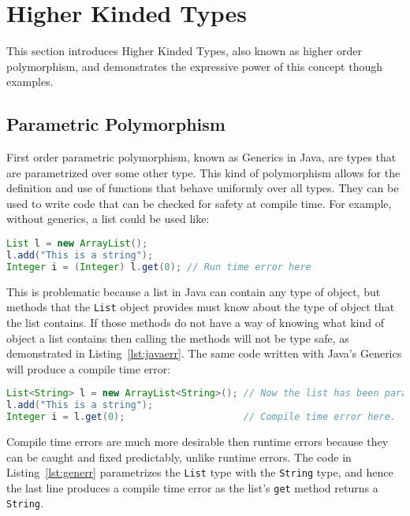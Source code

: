 \section{Higher Kinded Types}
This section introduces Higher Kinded Types, also known as higher order
polymorphism, and demonstrates the expressive power of this concept though
examples.

\subsection{Parametric Polymorphism}\label{sec:generics}
First order parametric polymorphism, known as Generics in Java, are types that
are parametrized over some other type. This kind of polymorphism allows for the
definition and use of functions that behave uniformly over all types.  They can
be used to write code that can be checked for safety at compile time. For
example, without generics, a list could be used like:

\begin{lstlisting}[caption=Runtime error that could be avoided, language=Java, label={lst:javaerr}]
List l = new ArrayList();
l.add("This is a string");
Integer i = (Integer) l.get(0); // Run time error here
\end{lstlisting}

This is problematic because a list in Java can contain any type of object, but
methods that the \lstinline{List} object provides must know about the type of
object that the list contains. If those methods do not have a way of knowing
what kind of object a list contains then calling the methods will not be type
safe, as demonstrated in Listing~\ref{lst:javaerr}. The same code written with
Java's Generics will produce a compile time error:

\begin{lstlisting}[caption=Compile time error, language=Java, label={lst:generr}]
List<String> l = new ArrayList<String>(); // Now the list has been parametrized with a type
l.add("This is a string");
Integer i = l.get(0);                     // Compile time error here.
\end{lstlisting}

Compile time errors are much more desirable then runtime errors because they
can be caught and fixed predictably, unlike runtime errors.  The code in
Listing~\ref{lst:generr} parametrizes the \lstinline{List} type with the
\lstinline{String} type, and hence the last line produces a compile time error
as the list's \lstinline{get} method returns a \lstinline{String}. 

